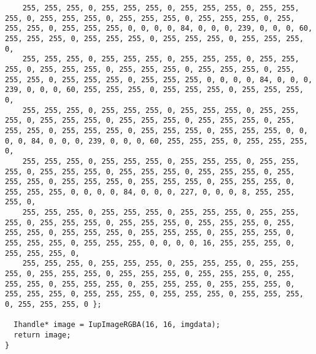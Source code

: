 \documentclass{ctexart}
\begin{document}
\begin{lstlisting}
    255, 255, 255, 0, 255, 255, 255, 0, 255, 255, 255, 0, 255, 255, 255, 0, 255, 255, 255, 0, 255, 255, 255, 0, 255, 255, 255, 0, 255, 255, 255, 0, 255, 255, 255, 0, 0, 0, 0, 84, 0, 0, 0, 239, 0, 0, 0, 60, 255, 255, 255, 0, 255, 255, 255, 0, 255, 255, 255, 0, 255, 255, 255, 0,
    255, 255, 255, 0, 255, 255, 255, 0, 255, 255, 255, 0, 255, 255, 255, 0, 255, 255, 255, 0, 255, 255, 255, 0, 255, 255, 255, 0, 255, 255, 255, 0, 255, 255, 255, 0, 255, 255, 255, 0, 0, 0, 0, 84, 0, 0, 0, 239, 0, 0, 0, 60, 255, 255, 255, 0, 255, 255, 255, 0, 255, 255, 255, 0,
    255, 255, 255, 0, 255, 255, 255, 0, 255, 255, 255, 0, 255, 255, 255, 0, 255, 255, 255, 0, 255, 255, 255, 0, 255, 255, 255, 0, 255, 255, 255, 0, 255, 255, 255, 0, 255, 255, 255, 0, 255, 255, 255, 0, 0, 0, 0, 84, 0, 0, 0, 239, 0, 0, 0, 60, 255, 255, 255, 0, 255, 255, 255, 0,
    255, 255, 255, 0, 255, 255, 255, 0, 255, 255, 255, 0, 255, 255, 255, 0, 255, 255, 255, 0, 255, 255, 255, 0, 255, 255, 255, 0, 255, 255, 255, 0, 255, 255, 255, 0, 255, 255, 255, 0, 255, 255, 255, 0, 255, 255, 255, 0, 0, 0, 0, 84, 0, 0, 0, 227, 0, 0, 0, 8, 255, 255, 255, 0,
    255, 255, 255, 0, 255, 255, 255, 0, 255, 255, 255, 0, 255, 255, 255, 0, 255, 255, 255, 0, 255, 255, 255, 0, 255, 255, 255, 0, 255, 255, 255, 0, 255, 255, 255, 0, 255, 255, 255, 0, 255, 255, 255, 0, 255, 255, 255, 0, 255, 255, 255, 0, 0, 0, 0, 16, 255, 255, 255, 0, 255, 255, 255, 0,
    255, 255, 255, 0, 255, 255, 255, 0, 255, 255, 255, 0, 255, 255, 255, 0, 255, 255, 255, 0, 255, 255, 255, 0, 255, 255, 255, 0, 255, 255, 255, 0, 255, 255, 255, 0, 255, 255, 255, 0, 255, 255, 255, 0, 255, 255, 255, 0, 255, 255, 255, 0, 255, 255, 255, 0, 255, 255, 255, 0, 255, 255, 255, 0 };

  Ihandle* image = IupImageRGBA(16, 16, imgdata);
  return image;
}


\end{lstlisting}
\end{document}
